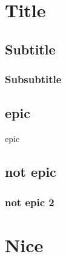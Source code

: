 \clearpage

\section{Title}

\lipsum[5]

\subsection{Subtitle}

\lipsum[5]

\subsubsection{Subsubtitle}

\lipsum[5]


\lipsum[5]

\begin{appendixd}
	\section{epic}
	epic
	
	\subsection{not epic}
	\subsubsection{not epic 2}
\end{appendixd}

\section{Nice}


